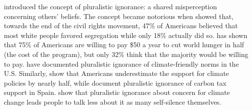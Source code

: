 \citet{allport_social_1924} introduced the concept of pluralistic ignorance: a shared misperception concerning others' beliefs. The concept became notorious when \citet{ogorman_pluralistic_1975} showed that, towards the end of the civil rights movement, 47\% of Americans believed that most white people favored segregation while only 18\% actually did so. %
\citet{pipa_americans_2001} has shown that 75\% of Americans are willing to pay \$50 a year to cut world hunger in half (the cost of the program), but only 32\% think that the majority would be willing to pay.
\citet{andre_fighting_2021} have documented pluralistic ignorance of climate-friendly norms in the U.S. Similarly, \citet{sparkman_americans_2022} show that Americans underestimate the support for climate policies by nearly half, while \citet{drews_biased_2022} document pluralistic ignorance of carbon tax support in Spain. 
\citet{geiger_climate_2016} show that pluralistic ignorance about concern for climate change leads people to talk less about it as many self-silence themselves. 

